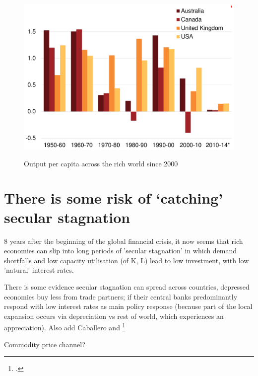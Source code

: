 \begin{figure}[p] 
 \caption{Output per capita across the rich world since 2000}
 \includegraphics[page=2]{atlas/Ch1.pdf}\label{fig:percap}



\end{figure}

\section{There is some risk of `catching' secular stagnation}

8 years after the beginning of the global financial crisis, it now seems that rich economies can slip into long periods of 'secular stagnation' in which demand shortfalls and low capacity utilisation (of K, L) lead to low investment, with low 'natural' interest rates. 

There is some evidence  secular stagnation can spread across countries, depressed economies buy less from trade partners; if their central banks predominantly respond with low interest rates as main policy response (because part of the local expansion occurs via depreciation vs rest of world, which experiences an appreciation). Also add Caballero and \footcite{eggertsson2016} %

Commodity price channel?

